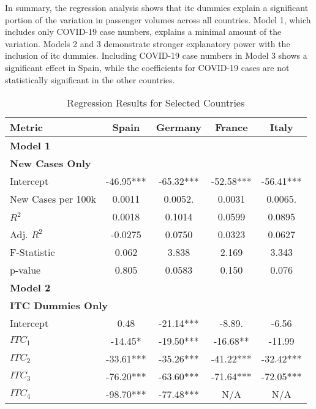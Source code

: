 \documentclass[12pt,onehalfspacing,headsepline,oneside,openright,a4paper, fleqn]{report}
\begin{document}
In summary, the regression analysis shows that \gls{itc} dummies explain a significant portion of the variation in passenger volumes across all countries. Model 1, which includes only COVID-19 case numbers, explains a minimal amount of the variation. Models 2 and 3 demonstrate stronger explanatory power with the inclusion of \gls{itc} dummies. Including COVID-19 case numbers in Model 3 shows a significant effect in Spain, while the coefficients for COVID-19 cases are not statistically significant in the other countries.



\begin{table}[H]
\centering
\caption{Regression Results for Selected Countries}
\label{tab:regression_results_compact}
\begin{adjustbox}{width=\textwidth}
\renewcommand{\arraystretch}{1.335}
\begin{tabular}{lcccc}
\toprule
\textbf{Metric} & \textbf{Spain} & \textbf{Germany} & \textbf{France} & \textbf{Italy} \\
\midrule
\multicolumn{5}{l}{\textbf{\normalsize Model 1}} \\
\multicolumn{5}{l}{\textbf{New Cases Only}} \\
Intercept           & -46.95*** & -65.32*** & -52.58*** & -56.41*** \\
New Cases per 100k  & 0.0011    & 0.0052.   & 0.0031    & 0.0065.   \\
$R^2$               & 0.0018    & 0.1014    & 0.0599    & 0.0895    \\
Adj. $R^2$          & -0.0275   & 0.0750    & 0.0323    & 0.0627    \\
F-Statistic         & 0.062     & 3.838     & 2.169     & 3.343     \\
p-value             & 0.805     & 0.0583    & 0.150     & 0.076     \\
\midrule
\multicolumn{5}{l}{\textbf{\normalsize Model 2}} \\
\multicolumn{5}{l}{\textbf{ITC Dummies Only}} \\
Intercept           & 0.48      & -21.14*** & -8.89.    & -6.56     \\
$ITC_1$              & -14.45*   & -19.50*** & -16.68**  & -11.99    \\
$ITC_2$              & -33.61*** & -35.26*** & -41.22*** & -32.42*** \\
$ITC_3$              & -76.20*** & -63.60*** & -71.64*** & -72.05*** \\
$ITC_4$              & -98.70*** & -77.48*** & N/A        & N/A        \\

\end{tabular}
\end{adjustbox}
\end{table}
\end{document}
